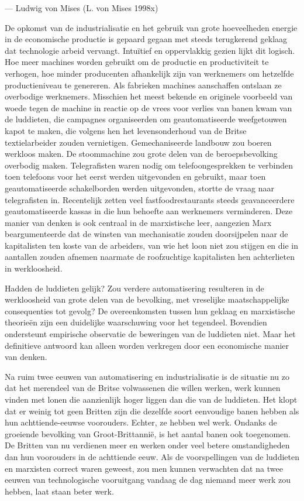 \documentclass[
  a5paper,
  smalldemyvopaper,11pt,twoside,onecolumn,openright,extrafontsizes,
hidelinks]{memoir}
\begin{document}
--- Ludwig von Mises (L. von Mises 1998x)

De opkomst van de industrialisatie en het gebruik van grote hoeveelheden
energie in de economische productie is gepaard gegaan met steeds
terugkerend geklaag dat technologie arbeid vervangt. Intuïtief en
oppervlakkig gezien lijkt dit logisch. Hoe meer machines worden gebruikt
om de productie en productiviteit te verhogen, hoe minder producenten
afhankelijk zijn van werknemers om hetzelfde productieniveau te
genereren. Als fabrieken machines aanschaffen ontslaan ze overbodige
werknemers. Misschien het meest bekende en originele voorbeeld van woede
tegen de machine in reactie op de vrees voor verlies van banen kwam van
de luddieten, die campagnes organiseerden om geautomatiseerde
weefgetouwen kapot te maken, die volgens hen het levensonderhoud van de
Britse textielarbeider zouden vernietigen. Gemechaniseerde landbouw zou
boeren werkloos maken. De stoommachine zou grote delen van de
beroepsbevolking overbodig maken. Telegrafisten waren nodig om
telefoongesprekken te verbinden toen telefoons voor het eerst werden
uitgevonden en gebruikt, maar toen geautomatiseerde schakelborden werden
uitgevonden, stortte de vraag naar telegrafisten in. Recentelijk zetten
veel fastfoodrestaurants steeds geavanceerdere geautomatiseerde kassas
in die hun behoefte aan werknemers verminderen. Deze manier van denken
is ook centraal in de marxistische leer, aangezien Marx beargumenteerde
dat de winsten van mechanisatie zouden doorsijpelen naar de kapitalisten
ten koste van de arbeiders, van wie het loon niet zou stijgen en die in
aantallen zouden afnemen naarmate de roofzuchtige kapitalisten hen
achterlieten in werkloosheid.

Hadden de luddieten gelijk? Zou verdere automatisering resulteren in de
werkloosheid van grote delen van de bevolking, met vreselijke
maatschappelijke consequenties tot gevolg? De overeenkomsten tussen hun
geklaag en marxistische theorieën zijn een duidelijke waarschuwing voor
het tegendeel. Bovendien ondersteunt empirische observatie de beweringen
van de luddieten niet. Maar het definitieve antwoord kan alleen worden
verkregen door een economische manier van denken.

Na ruim twee eeuwen van automatisering en industrialisatie is de
situatie nu zo dat het merendeel van de Britse volwassenen die willen
werken, werk kunnen vinden met lonen die aanzienlijk hoger liggen dan
die van de luddieten. Het klopt dat er weinig tot geen Britten zijn die
dezelfde soort eenvoudige banen hebben als hun achttiende-eeuwse
voorouders. Echter, ze hebben wel werk. Ondanks de groeiende bevolking
van Groot-Brittannië, is het aantal banen ook toegenomen. De Britten van
nu verdienen meer en werken onder veel betere omstandigheden dan hun
voorouders in de achttiende eeuw. Als de voorspellingen van de luddieten
en marxisten correct waren geweest, zou men kunnen verwachten dat na
twee eeuwen van technologische vooruitgang vandaag de dag niemand meer
werk zou hebben, laat staan beter werk.
\end{document}
